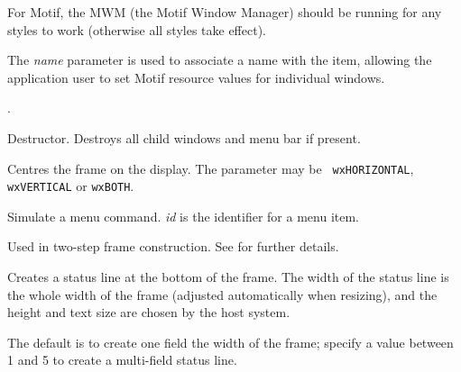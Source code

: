 For Motif, the MWM (the Motif Window Manager) should be running for any styles to work
(otherwise all styles take effect).

The {\it name} parameter is used to associate a name with the item,
allowing the application user to set Motif resource values for
individual windows.

.



Destructor. Destroys all child windows and menu bar if present.



Centres the frame on the display. The parameter may be {\tt
wxHORIZONTAL}, {\tt wxVERTICAL} or {\tt wxBOTH}.



Simulate a menu command. {\it id} is the identifier for a menu item.



Used in two-step frame construction. See \rtfsp
for further details.

\label{wxframecreatestatusline}


Creates a status line at the bottom of the frame. The width of the
status line is the whole width of the frame (adjusted automatically when
resizing), and the height and text size are chosen by the host system.

The default is to create one field the width of the frame; specify a
value between 1 and 5 to create a multi-field status line.

